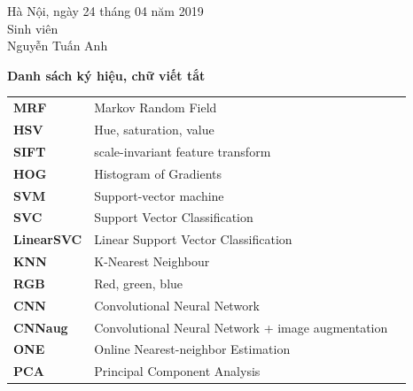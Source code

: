 \documentclass[12pt]{report}
\begin{document}
		\begin{flushright}
			\begin{varwidth}{\linewidth}\centering
				Hà Nội, ngày 24 tháng 04 năm 2019\\
				Sinh viên\\[2cm]
				Nguyễn Tuấn Anh
			\end{varwidth}
		\end{flushright}
																								
		\newpage
		\tableofcontents
																								
		\newpage
		\listoftables
																								
		\newpage
		\begin{flushleft}
			\bfseries{\Huge{Danh sách ký hiệu, chữ viết tắt}}
		\end{flushleft}
		\begin{table}[h]
			\centering
			\begin{tabular}{lll}
				\textbf{MRF}       & Markov Random Field                               \\[0.3cm]
				\textbf{HSV}       & Hue, saturation, value                            \\[0.3cm]
				\textbf{SIFT}      & scale-invariant feature transform                 \\[0.3cm]
				\textbf{HOG}       & Histogram of Gradients                            \\[0.3cm]
				\textbf{SVM}       & Support-vector machine                            \\[0.3cm]
				\textbf{SVC}       & Support Vector Classification                     \\[0.3cm]
				\textbf{LinearSVC} & Linear Support Vector Classification              \\[0.3cm]
				\textbf{KNN}       & K-Nearest Neighbour                               \\[0.3cm]
				\textbf{RGB}       & Red, green, blue                                  \\[0.3cm]
				\textbf{CNN}       & Convolutional Neural Network                      \\[0.3cm]
				\textbf{CNNaug}    & Convolutional Neural Network + image augmentation \\[0.3cm]
				\textbf{ONE}       & Online Nearest-neighbor Estimation                \\[0.3cm]
				\textbf{PCA}       & Principal Component Analysis                      \\[0.3cm]
																																																		
			\end{tabular}
		\end{table}
																								
\end{document}

